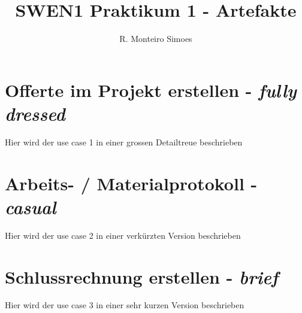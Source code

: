 \documentclass[journal]{combine}
\begin{document}
	
	\title{SWEN1 Praktikum 1 - Artefakte}
	\author{ R. Monteiro Simoes}
	\maketitle

	\newpage

	\tableofcontents

	\newpage
	
	\section{Offerte im Projekt erstellen - \emph{fully dressed}}
		Hier wird der use case 1 in einer grossen Detailtreue beschrieben
	\newpage
	\section{Arbeits- / Materialprotokoll  - \emph{casual}}
		Hier wird der use case 2 in einer verkürzten Version beschrieben
	\newpage
	\section{Schlussrechnung erstellen - \emph{brief}}
		Hier wird der use case 3 in einer sehr kurzen Version beschrieben
\end{document}
